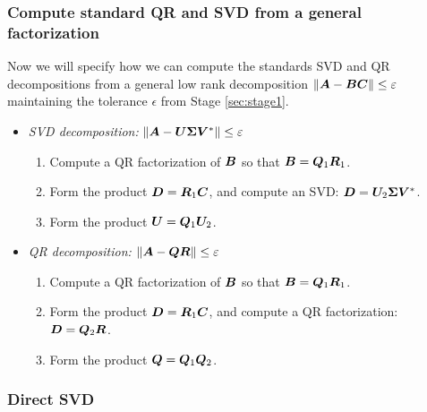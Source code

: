 \subsubsection{Compute standard QR and SVD from a general factorization}
Now we will specify how we can compute the standards SVD and QR decompositions
from a general low rank decomposition $\|\bm{A} - \bm{B}\bm{C}\|\leq\varepsilon$
maintaining the tolerance $\epsilon$ from Stage \ref{sec:stage1}.

\begin{itemize}
  \item \label{itm:SVD-from-C} \textit{SVD decomposition:} $\|\bm{A}-\bm{U}\bm{\Sigma}\bm{V}^*\|\leq\varepsilon$
\lsp
\begin{enumerate}
\item Compute a QR factorization of $\bm{B}$ so that $\bm{B} = \bm{Q}_{1}\bm{R}_{1}$.
\item Form the product $\bm{D} = \bm{R}_{1}\bm{C}$, and compute an SVD:
      $\bm{D} = \bm{U}_{2}\bm{\Sigma}\bm{V}^{*}$.
\item Form the product $\bm{U} = \bm{Q}_{1}\bm{U}_{2}$.
\end{enumerate}
\lsp

\item \label{itm:QR-from-C} \textit{QR decomposition:} $\|\bm{A}-\bm{Q}\bm{R}\|\leq\varepsilon$
\lsp
\begin{enumerate}
\item Compute a QR factorization of $\bm{B}$ so that $\bm{B} = \bm{Q}_{1}\bm{R}_{1}$.
\item Form the product $\bm{D} = \bm{R}_{1}\bm{C}$, and compute a QR factorization: $\bm{D} = \bm{Q}_{2}\bm{R}$.
\item Form the product $\bm{Q} = \bm{Q}_{1}\bm{Q}_{2}$.
\end{enumerate}

\end{itemize}

\subsubsection{Direct SVD} \label{alg:direct-svd}

